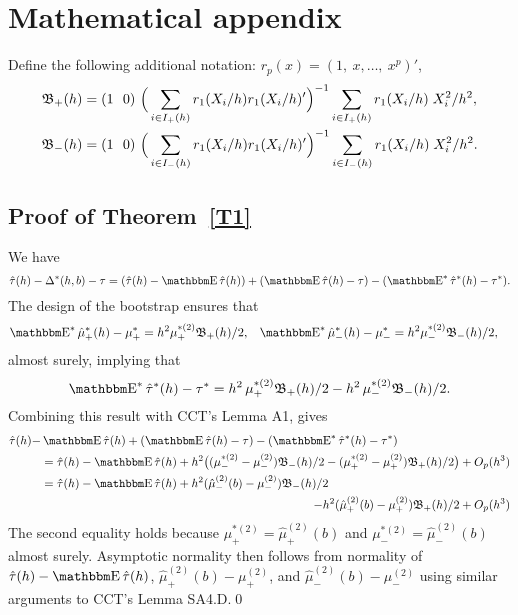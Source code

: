 \documentclass[12pt,fleqn]{article}
\begin{document}
\appendix
\section{Mathematical appendix}

Define the following additional notation:
$r_p(x) = (1,\ x,\dots,\ x^p)'$,
\begin{align}
  \label{eq:5}
  \Bf_+(h)
  & = (1\ \  0)\ \Big(\ssum[+]{i}{h} r_1(X_i/h) r_1(X_i/h)' \Big)^{-1}
    \ssum[+]{i}{h} r_1(X_i/h) \; X_i^2 / h^2, \\
  \label{eq:6}
  \Bf_-(h)
  & = (1\ \ 0)\ \Big(\ssum[-]{i}{h} r_1(X_i/h) r_1(X_i/h)' \Big)^{-1}
    \ssum[-]{i}{h} r_1(X_i/h) \; X_i^2 / h^2.
\end{align}

\subsection{Proof of Theorem~\ref{T1}}
We have
\begin{equation*}
  \hat\tau(h) - \Delta^*(h,b) - \tau = (\hat\tau(h) - \E \hat \tau(h)) +
  (\E \hat \tau(h) - \tau) - (\E^* \hat \tau^*(h) - \tau^*).
\end{equation*}
The design of the bootstrap ensures that
\begin{align*}
  \E^* \hat\mu_{+}^*(h) - \mu_{+}^{*}
  &= h^{2} \mu_+^{*(2)} \Bf_{+}(h)/2,
  &\E^* \hat\mu_{-}^*(h) - \mu_{-}^{*}
  &= h^{2} \mu_-^{*(2)} \Bf_{-}(h)/2,
\end{align*}
almost surely, implying that
\begin{equation*}
    \E^* \hat\tau^*(h) - \tau^{*} = h^2\, \mu_+^{*(2)} \Bf_+(h)/2
      - h^2\, \mu_{-}^{*(2)} \Bf_{-}(h)/2.
\end{equation*}
Combining this result with CCT's Lemma A1, gives
\begin{align}
  \hat\tau(h) - & \E \hat\tau(h) + (\E \hat\tau(h) - \tau) - (\E^* \hat\tau^*(h) - \tau^*)\notag \\
  &= \hat\tau(h) - \E\hat\tau(h)
   + h^2 \big((\mu_{-}^{*(2)} - \mu_{-}^{(2)}) \Bf_{-}(h) /2
   - (\mu_+^{*(2)}-\mu_+^{(2)}) \Bf_{+}(h) / 2 \big) + O_p(h^{3}) \notag \\
  \label{eq:7}
  &= \hat\tau(h) - \E\hat\tau(h)
   + h^2 (\hat\mu_-^{(2)}(b) - \mu_-^{(2)}) \Bf_{-}(h) /2 \\
  \notag
  &\pushright{- h^2 (\hat\mu_+^{(2)}(b) - \mu_+^{(2)}) \Bf_{+}(h) / 2 + O_p(h^{3})}
\end{align}
The second equality holds because
$\mu_+^{*(2)} = \hat\mu_{+}^{(2)}(b)$ and
$\mu_-^{*(2)} = \hat\mu_{-}^{(2)}(b)$ almost surely. Asymptotic
normality then follows from normality of $\hat\tau(h) - \E\hat\tau(h)$,
$\hat\mu_+^{(2)}(b) - \mu_+^{(2)}$, and
$\hat\mu_-^{(2)}(b) - \mu_-^{(2)}$ using similar arguments to
CCT's Lemma SA4.D.\qed
\end{document}
